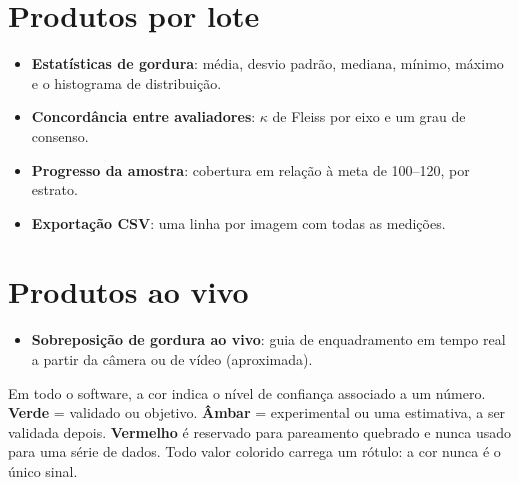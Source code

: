 \section{Produtos por lote}

\begin{itemize}[leftmargin=1.3em,itemsep=3pt]
  \item \textbf{Estatísticas de gordura}: média, desvio padrão, mediana,
        mínimo, máximo e o histograma de distribuição.
  \item \textbf{Concordância entre avaliadores}: $\kappa$ de Fleiss por eixo e
        um grau de consenso.
  \item \textbf{Progresso da amostra}: cobertura em relação à meta de
        100--120, por estrato.
  \item \textbf{Exportação CSV}: uma linha por imagem com todas as medições.
\end{itemize}

\section{Produtos ao vivo}

\begin{itemize}[leftmargin=1.3em,itemsep=3pt]
  \item \textbf{Sobreposição de gordura ao vivo}: guia de enquadramento em
        tempo real a partir da câmera ou de vídeo (aproximada).
\end{itemize}

\begin{note}[title=Lendo o código de cores]
Em todo o software, a cor indica o nível de confiança associado a um número.
\textbf{Verde} = validado ou objetivo. \textbf{Âmbar} = experimental ou uma
estimativa, a ser validada depois. \textbf{Vermelho} é reservado para pareamento
quebrado e nunca usado para uma série de dados. Todo valor colorido carrega um
rótulo: a cor nunca é o único sinal.
\end{note}
